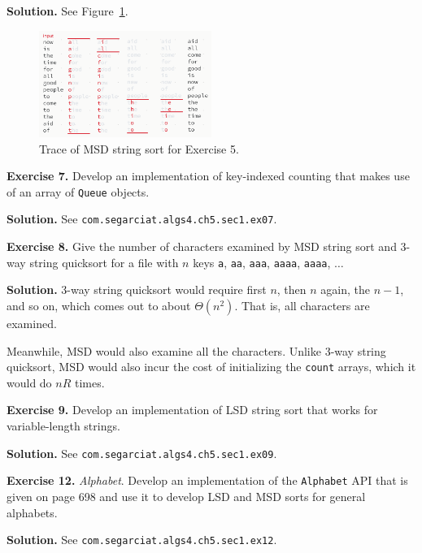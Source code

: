 \documentclass[12pt, a4paper]{article}
\newenvironment{ex}[2][Exercise]
{\par\medskip\noindent \textbf{#1 #2.}}
{\medskip}
\newenvironment{sol}[1][Solution]
{\par\medskip\noindent \textbf{#1.} }
{\medskip}
\begin{document}
	\begin{sol}
		See Figure~\ref{fig:ex-05}.
		\begin{figure}
			\centering
			\includegraphics[width=0.5\textwidth]{exercise-05}
			\caption{Trace of MSD string sort for Exercise 5.}
			\label{fig:ex-05}
		\end{figure}
	\end{sol}
	\begin{ex}{7}
		Develop an implementation of key-indexed counting that makes use of an array
		of \texttt{Queue} objects.
	\end{ex}
	\begin{sol}
		See \texttt{com.segarciat.algs4.ch5.sec1.ex07}.
	\end{sol}
	\begin{ex}{8}
		Give the number of characters examined by MSD string sort and 3-way string quicksort
		for a file with $n$ keys \texttt{a}, \texttt{aa}, \texttt{aaa}, \texttt{aaaa},
		\texttt{aaaa}, $\ldots$
	\end{ex}
	\begin{sol}
		3-way string quicksort would require first $n$, then $n$ again, the $n-1$, and so on,
		which comes out to about $\Theta(n^2)$. That is, all characters are examined.
		
		Meanwhile, MSD would also examine all the characters. Unlike 3-way string quicksort,
		MSD would also incur the cost of initializing the \texttt{count} arrays, which
		it would do $nR$ times.
	\end{sol}
	\begin{ex}{9}
		Develop an implementation of LSD string sort that works for variable-length strings.
	\end{ex}
	\begin{sol}
		See \texttt{com.segarciat.algs4.ch5.sec1.ex09}.
	\end{sol}
	\begin{ex}{12}
		\emph{Alphabet}. Develop an implementation of the \texttt{Alphabet} API that is given
		on page 698 and use it to develop LSD and MSD sorts for general alphabets.
	\end{ex}
	\begin{sol}
		See \texttt{com.segarciat.algs4.ch5.sec1.ex12}.
	\end{sol}
	\pagebreak
	\printbibliography
\end{document}
